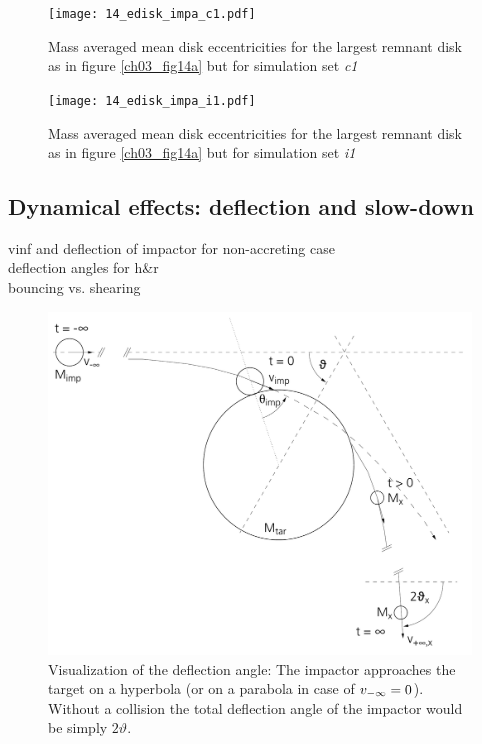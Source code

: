 {\begin{landscape}
\begin{figure}
\begin{center}
\texttt{[image: 14\_edisk\_impa\_c1.pdf]}
\caption{Mass averaged mean disk eccentricities for the largest remnant disk as in figure \ref{ch03_fig14a} but for simulation set \emph{c1}}
\label{ch03_fig14b}
\end{center}
\end{figure}

\begin{figure}
\begin{center}
\texttt{[image: 14\_edisk\_impa\_i1.pdf]}
\caption{Mass averaged mean disk eccentricities for the largest remnant disk as in figure \ref{ch03_fig14a} but for simulation set \emph{i1}}
\label{ch03_fig14c}
\end{center}
\end{figure}
\end{landscape}
}

\subsection{Dynamical effects: deflection and slow-down}
vinf and deflection of impactor for non-accreting case\\
deflection angles for h\&r \\
bouncing vs. shearing \\

\begin{figure}
\begin{center}
\includegraphics[scale=0.5]{04_vartheta}
\caption{Visualization of the deflection angle: The impactor approaches the target on a hyperbola (or on a parabola in case of $v_{-\infty} = 0$). Without a collision the total deflection angle of the impactor would be simply $2 \vartheta$.}
\label{ch03_fig02}
\end{center}
\end{figure}


